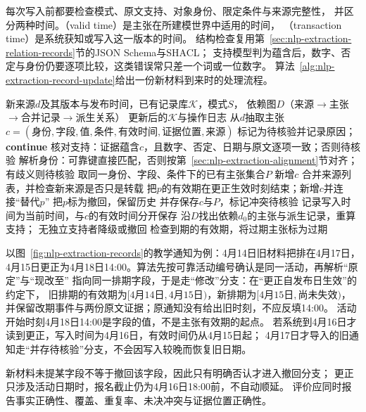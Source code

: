 每次写入前都要检查模式、原文支持、对象身份、限定条件与来源完整性，
并区分两种时间。（valid time）是主张在所建模世界中适用的时间，
（transaction time）是系统获知或写入这一版本的时间。
结构检查复用第~\ref{sec:nlp-extraction-relation-records}节的JSON Schema与SHACL；
支持模型判为蕴含后，数字、否定与身份仍要逐项比较，这类错误常只差一个词或一位数字。
算法~\ref{alg:nlp-extraction-record-update}给出一份新材料到来时的处理流程。

\begin{algorithm}[知识记录的核验与增量更新]
  \label{alg:nlp-extraction-record-update}
  \begin{algorithmic}[1]
    \Require 新来源$d$及其版本与发布时间，已有记录库$\mathcal{K}$，模式$S$，
      依赖图$D$（来源$\to$主张$\to$合并记录$\to$派生关系）
    \Ensure 更新后的$\mathcal{K}$与操作日志
    \State 从$d$抽取主张$c=(\text{身份},\text{字段},\text{值},\text{条件},\text{有效时间},\text{证据位置},\text{来源})$
        \State 标记为待核验并记录原因；\textbf{continue}
      \EndIf
      \State 核对支持：证据蕴含$c$，且数字、否定、日期与原文逐项一致；否则待核验
      \State 解析身份：可靠键直接匹配，否则按第~\ref{sec:nlp-extraction-alignment}节对齐；
        有歧义则待核验
      \State 取同一身份、字段、条件下的已有主张集合$P$
        \State 新增$c$
        \State 合并来源列表，并检查新来源是否只是转载
        \State 把$p$的有效期在更正生效时刻结束；新增$c$并连接“替代$p$”
        \State 把$p$标为撤回，保留历史
      \Else
        \State 并存保存$c$与$P$，标记冲突待核验
      \EndIf
      \State 记录写入时间为当前时间，与$c$的有效时间分开保存
    \EndFor
      \State 沿$D$找出依赖$d_0$的主张与派生记录，重算支持；
        无独立支持者降级或撤回
    \EndIf
    \State 检查到期的有效期，将过期主张标为过期
  \end{algorithmic}
\end{algorithm}

以图~\ref{fig:nlp-extraction-records}的教学通知为例：4月14日旧材料把排在4月17日，
4月15日更正为4月18日14:00。算法先按可靠活动编号确认是同一活动，再解析“原定”与“现改至”
指向同一排期字段，于是走“修改”分支：在“更正自发布日生效”的约定下，
旧排期的有效期为$[\text{4月14日},\text{4月15日})$，新排期为$[\text{4月15日},\text{尚未失效})$，
并保留改期事件与两份原文证据；原通知没有给出旧时刻，不应反填14:00。
活动开始时刻4月18日14:00是字段的值，不是主张有效期的起点。
若系统到4月16日才读到更正，写入时间为4月16日，有效时间仍从4月15日起；
4月17日才导入的旧通知走“并存待核验”分支，不会因写入较晚而恢复旧日期。

新材料未提某字段不等于撤回该字段，因此只有明确否认才进入撤回分支；
更正只涉及活动日期时，报名截止仍为4月16日18:00前，不自动顺延。
评价应同时报告事实正确性、覆盖、重复率、未决冲突与证据位置正确性。

